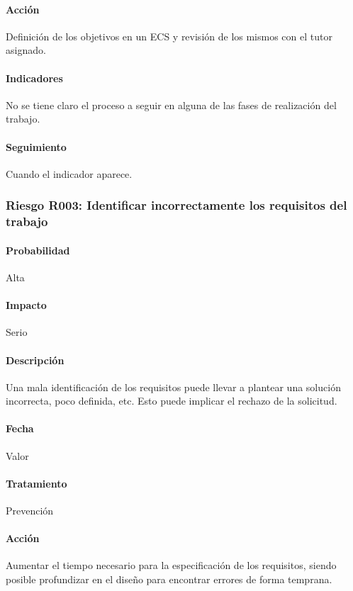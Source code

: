 \documentclass[10pt,a4paper]{article}
\begin{document}
				\paragraph{Acción} Definición de los objetivos en un ECS y revisión de los mismos con el tutor asignado. %
				\paragraph{Indicadores} No se tiene claro el proceso a seguir en alguna de las fases de realización del trabajo. %
				\paragraph{Seguimiento}	Cuando el indicador aparece. %
				
				\subsubsection{Riesgo R003: Identificar incorrectamente los requisitos del trabajo }
				\paragraph{Probabilidad} Alta
				\paragraph{Impacto}	Serio
				\paragraph{Descripción} Una mala identificación de los requisitos puede llevar a plantear una solución incorrecta, poco definida, etc. Esto puede implicar el rechazo de la solicitud.
				\paragraph{Fecha} Valor %
				\paragraph{Tratamiento} Prevención %
				\paragraph{Acción} Aumentar el tiempo necesario para la especificación de los requisitos, siendo posible profundizar en el diseño para encontrar errores de forma temprana. %
\end{document}
